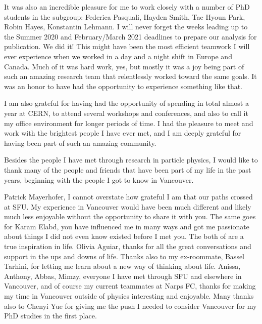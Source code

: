 It was also an incredible pleasure for me to work closely with a number of PhD students in the \HWW subgroup: 
Federica Pasquali, Hayden Smith, Tae Hyoun Park, Robin Hayes, Konstantin Lehmann. 
I will never forget the weeks leading up to the Summer 2020 and February/March 2021 deadlines to prepare our analysis for publication. We did it!
This might have been the most efficient teamwork I will ever experience when we worked in a day and a night shift in Europe and Canada. 
Much of it was hard work, yes, but mostly it was a joy being part of such an amazing research team that relentlessly worked toward the same goals. It was an honor to have had the opportunity to experience something like that. 

I am also grateful for having had the opportunity of spending in total almost a year at CERN, to attend several workshops and conferences, and also to call it my office environment for longer periods of time. 
I had the pleasure to meet and work with the brightest people I have ever met, and I am deeply grateful for having been part of such an amazing community. 

Besides the people I have met through research in particle physics, I would like to thank many of the people and friends that have been part of my life in the past years, beginning with the people I got to know in Vancouver. 

Patrick Mayerhofer, I cannot overstate how grateful I am that our paths crossed at SFU. My experience in Vancouver would have been much different and likely much less enjoyable without the opportunity to share it with you.
The same goes for Karam Elabd, you have influenced me in many ways and got me passionate about things I did not even know existed before I met you. The both of are a true inspiration in life.
Olivia Aguiar, thanks for all the great conversations and support in the ups and downs of life. 
Thanks also to my ex-roommate, Bassel Tarhini, for letting me learn about a new way of thinking about life. 
Anissa, Anthony, Abbas, Mimzy, everyone I have met through SFU and elsewhere in Vancouver, and of course my current teammates at Narps FC, thanks for making my time in Vancouver outside of physics interesting and enjoyable. 
Many thanks also to Chenyi Yue for giving me the push I needed to consider Vancouver for my PhD studies in the first place. 

